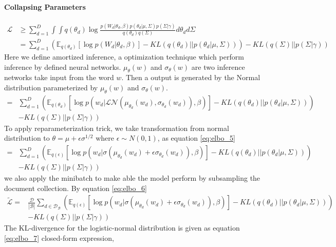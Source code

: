 \paragraph{Collapsing Parameters}
\begin{align}\label{eq:elbo_3}
\mathcal{L}&\geq\sum_{d=1}^{D}\int\int q(\theta_d)\log\frac{p(W_d|\theta_d,\beta)p(\theta_d|\mu,\Sigma)p(\Sigma|\gamma)}{q(\theta_d)q(\Sigma)}d\theta_d d\Sigma\\
&=\sum_{d=1}^{D}\left(\mathbb{E}_{q(\theta_d)}\left[\log p(W_d|\theta_d,\beta)\right]-KL(q(\theta_d)||p(\theta_d|\mu,\Sigma))\right)-KL(q(\Sigma)||p(\Sigma|\gamma))
\end{align}
Here we define amortized inference, a optimization technique which perform inference by defined neural networks. $ \mu_\theta(w) $ and $ \sigma_\theta(w) $ are two inference networks take input from the word $ w $. Then a output is generated by the Normal distribution parameterized by $ \mu_\theta(w) $ and $ \sigma_\theta(w) $.
\begin{align}\label{eq:elbo_4}
=&\sum_{d=1}^{D}\left(\mathbb{E}_{q(\theta_d)}\left[\log p(w_d|\mathcal{LN}(\mu_{\theta_d}(w_d),\sigma_{\theta_d}(w_d)),\beta)\right]-KL(q(\theta_d)||p(\theta_d|\mu,\Sigma))\right)\\
&-KL(q(\Sigma)||p(\Sigma|\gamma))
\end{align}
To apply reparameterization trick, we take transformation from normal distribution to $ \theta=\mu+\epsilon\sigma^{1/2} $ where $ \epsilon\sim N(0,1) $, as  equation \ref{eq:elbo_5}
\begin{align}\label{eq:elbo_5}
=&\sum_{d=1}^{D}\left(\mathbb{E}_{q(\epsilon)}\left[\log p(w_d|\sigma(\mu_{\theta_d}(w_d)+\epsilon\sigma_{\theta_d}(w_d)),\beta)\right]-KL(q(\theta_d)||p(\theta_d|\mu,\Sigma))\right)\\
&-KL(q(\Sigma)||p(\Sigma|\gamma))
\end{align}
we also apply the minibatch to make able the model perform by subsampling the document collection. By equation \ref{eq:elbo_6}
\begin{align}\label{eq:elbo_6}
\tilde{\mathcal{L}}=&\frac{\mathcal{D}}{|\mathcal{B}|}\sum_{d\in\mathcal{D_B}}\left(\mathbb{E}_{q(\epsilon)}\left[\log p(w_d|\sigma(\mu_{\theta_d}(w_d)+\epsilon\sigma_{\theta_d}(w_d)),\beta)\right]-KL(q(\theta_d)||p(\theta_d|\mu,\Sigma))\right)\\
&-KL(q(\Sigma)||p(\Sigma|\gamma))
\end{align}
The KL-divergence for the logistic-normal distribution is given as equation \ref{eq:elbo_7} closed-form expression,
